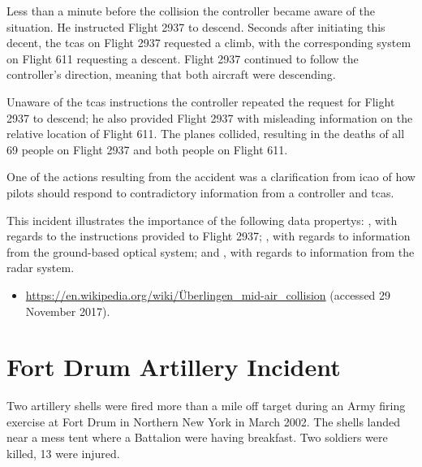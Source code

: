 Less than a minute before the collision the controller became aware of the situation. He instructed Flight 2937 to descend. Seconds after initiating this decent, the \gls{tcas} on Flight 2937 requested a climb, with the corresponding system on Flight 611 requesting a descent. Flight 2937 continued to follow the controller's direction, meaning that both aircraft were descending.

Unaware of the \gls{tcas} instructions the controller repeated the request for Flight 2937 to descend; he also provided Flight 2937 with misleading \gls{information} on the relative location of Flight 611. The planes collided, resulting in the deaths of all 69 people on Flight 2937 and both people on Flight 611.

One of the actions resulting from the accident was a clarification from \gls{icao} of how pilots should respond to contradictory \gls{information} from a controller and \gls{tcas}.

This incident illustrates the importance of the following \glspl{data property}: , with regards to the instructions provided to Flight 2937; , with regards to \gls{information} from the ground-based optical system; and , with regards to \gls{information} from the radar system.

\begin{samepage}
\begin{itemize}
	\item \raggedright{\href{https://en.wikipedia.org/wiki/\%C3\%9Cberlingen_mid-air_collision}{https://en.wikipedia.org/wiki/\"Uberlingen\_mid-air\_collision} (accessed 29 November 2017).}
\end{itemize}
\end{samepage}


\section{Fort Drum Artillery Incident} \label{bkm:incacc:fortdrum}
Two artillery shells were fired more than a mile off target during an Army firing exercise at Fort Drum in Northern New York in March 2002. The shells landed near a mess tent where a Battalion were having breakfast. Two soldiers were killed, 13 were injured. 

